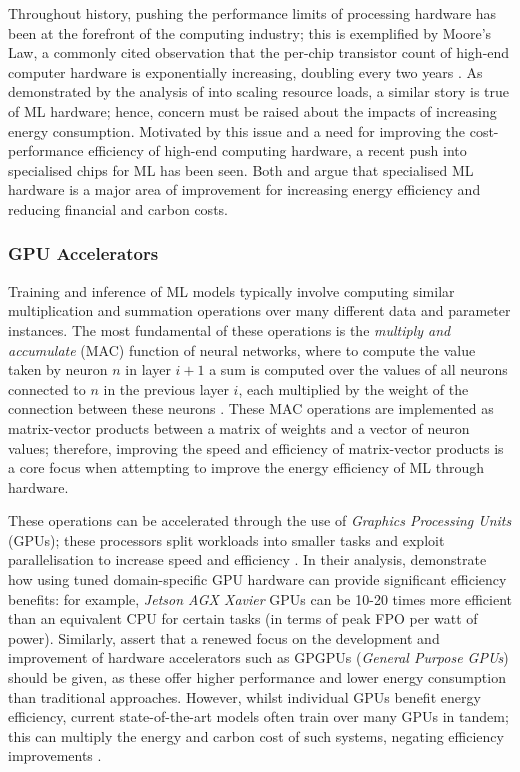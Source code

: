 \documentclass[a4paper, 12pt]{article}
\begin{document}
    Throughout history, pushing the performance limits of processing hardware has been at the forefront of the computing industry; this is exemplified by Moore's Law, a commonly cited observation that the per-chip transistor count of high-end computer hardware is exponentially increasing, doubling every two years \citep{amodei-hernandez-2021}. As demonstrated by the analysis of \citet{lacoste-2019} into scaling resource loads, a similar story is true of ML hardware; hence, concern must be raised about the impacts of increasing energy consumption. Motivated by this issue and a need for improving the cost-performance efficiency of high-end computing hardware, a recent push into specialised chips for ML has been seen. Both \citet{lacoste-2019} and \citet{sharma-kaulgud-2021} argue that specialised ML hardware is a major area of improvement for increasing energy efficiency and reducing financial and carbon costs.

    \subsubsection{GPU Accelerators}

    Training and inference of ML models typically involve computing similar multiplication and summation operations over many different data and parameter instances. The most fundamental of these operations is the \emph{multiply and accumulate} (MAC) function of neural networks, where to compute the value taken by neuron $n$ in layer $i+1$ a sum is computed over the values of all neurons connected to $n$ in the previous layer $i$, each multiplied by the weight of the connection between these neurons \citep{burr-2021}. These MAC operations are implemented as matrix-vector products between a matrix of weights and a vector of neuron values; therefore, improving the speed and efficiency of matrix-vector products is a core focus when attempting to improve the energy efficiency of ML through hardware. 

    These operations can be accelerated through the use of \emph{Graphics Processing Units} (GPUs); these processors split workloads into smaller tasks and exploit parallelisation to increase speed and efficiency \citep{kumar-2020}. In their analysis, \citet{lacoste-2019} demonstrate how using tuned domain-specific GPU hardware can provide significant efficiency benefits: for example, \emph{Jetson AGX Xavier} GPUs \citep{seznec-2021} can be 10-20 times more efficient than an equivalent CPU for certain tasks (in terms of peak FPO per watt of power). Similarly, \citet{sharma-kaulgud-2021} assert that a renewed focus on the development and improvement of hardware accelerators such as GPGPUs (\emph{General Purpose GPUs}) should be given, as these offer higher performance and lower energy consumption than traditional approaches. However, whilst individual GPUs benefit energy efficiency, current state-of-the-art models often train over many GPUs in tandem; this can multiply the energy and carbon cost of such systems, negating efficiency improvements \citep{leeuw-2021}.
\end{document}
